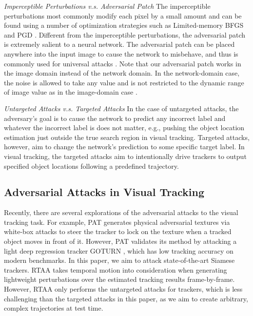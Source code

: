 \documentclass[journal]{IEEEtran}
\newcommand{\eg}{e.g.}
\begin{document}
\textit{Imperceptible Perturbations v.s. Adversarial Patch} The imperceptible perturbations most commonly modify each pixel by a small amount and can be found using a number of optimization strategies such as Limited-memory BFGS \cite{intriguing} and PGD \cite{PGD}.
Different from the imperceptible perturbations, the adversarial patch is extremely salient to a neural network. The adversarial patch can be placed anywhere into the input image to cause the network to misbehave, and thus is commonly used for universal attacks \cite{patch}. Note that our adversarial patch works in the image domain instead of the network domain. In the network-domain case, the noise is allowed to take any value and is not restricted to the dynamic range of image value as in the image-domain case \cite{karmon2018lavan}.

\textit{Untargeted Attacks v.s. Targeted Attacks} In the case of untargeted attacks, the adversary's goal is to cause the network to predict any incorrect label and whatever the incorrect label is does not matter, \eg, pushing the object location estimation just outside the true search region in visual tracking.
Targeted attacks, however, aim to change the network's prediction to some specific target label. In visual tracking, the targeted attacks aim to intentionally drive trackers to output specified object locations following a predefined trajectory.
\vspace{-2mm}

\subsection{Adversarial Attacks in Visual Tracking}

Recently, there are several explorations of the adversarial attacks to the visual tracking task. For example, PAT \cite{PAT} generates physical adversarial textures via white-box attacks to steer the tracker to lock on the texture when a tracked object moves in front of it. However, PAT validates its method by attacking a light deep regression tracker GOTURN \cite{GOTURN}, which has low tracking accuracy on modern benchmarks. In this paper, we aim to attack state-of-the-art Siamese trackers.
RTAA \cite{RTAA} takes temporal motion into consideration when generating lightweight perturbations over the estimated tracking results frame-by-frame. However, RTAA only performs the untargeted attacks for trackers, which is less challenging than the targeted attacks in this paper, as we aim to create arbitrary, complex trajectories at test time. 
\end{document}
